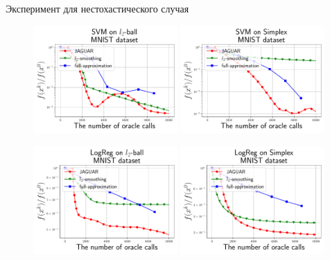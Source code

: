 \documentclass{beamer}
\begin{document}
\begin{frame}{Эксперимент для нестохастического случая}

    \begin{figure}[H]
        \centering
        \includegraphics[width=0.49\textwidth]{figures/None_stochastics_FW_SVM_L2_MNIST.pdf}
        \includegraphics[width=0.49\textwidth]{figures/None_stochastics_FW_SVM_Simplex_MNIST.pdf}

        \includegraphics[width=0.49\textwidth]{figures/None_stochastics_FW_LogReg_L2_MNIST.pdf}
        \includegraphics[width=0.49\textwidth]{figures/None_stochastics_FW_LogReg_Simplex_MNIST.pdf}
        
    \end{figure}

\end{frame}
\end{document}
